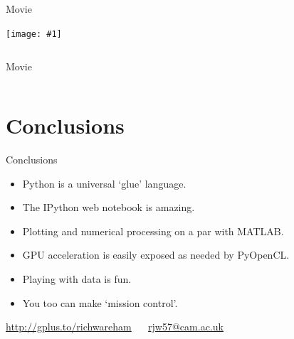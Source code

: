 \documentclass[aspectratio=169]{beamer}
\newcommand{\tallimage}[1]{%
  \begin{frame}
    \centering
    \texttt{[image: \#1]}
    \\
  \end{frame}
}
\begin{document}
\begin{frame}
  \centering\Huge
  Movie
  \\
\end{frame}

\tallimage{img/git-repo.png}

\begin{frame}
  \inputminted{python}{bng-speed-links.py}
\end{frame}

\begin{frame}
  \centering\Huge
  Movie
  \\
\end{frame}

\begin{frame}
  \inputminted{python}{ephem.py}
\end{frame}

\section{Conclusions}

\begin{frame}{Conclusions}
  \begin{itemize}
    \item Python is a universal `glue' language.
    \item The IPython web notebook is amazing.
    \item Plotting and numerical processing on a par with MATLAB.
    \item GPU acceleration is easily exposed as needed by PyOpenCL.
    \item Playing with data is fun.
    \item You too can make `mission control'.
  \end{itemize}
  \vspace{2\baselineskip}
  \begin{centering}
    \url{http://gplus.to/richwareham} $\quad$ \url{rjw57@cam.ac.uk}\\
  \end{centering}
\end{frame}
\end{document}

